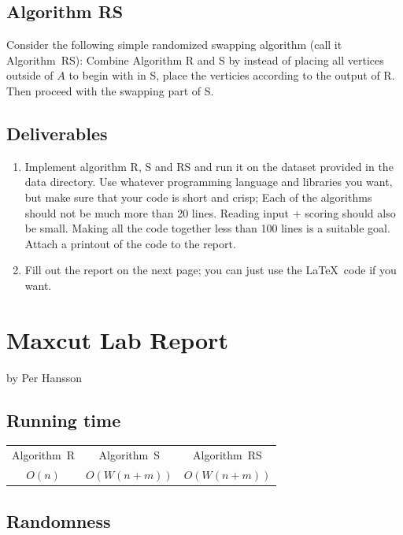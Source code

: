 \documentclass{tufte-handout}
\begin{document}
\subsection{Algorithm RS}
Consider the following simple randomized swapping algorithm (call
it Algorithm~RS): Combine Algorithm R and S by instead of placing
all vertices outside of $A$ to begin with in S, place the verticies according
to the output of R. Then proceed with the swapping part of S.

\subsection{ Deliverables}

\begin{enumerate}
\item Implement algorithm R, S and RS and run it on the dataset provided in
  the data directory.
  Use whatever programming language and libraries you want, but make
  sure that your code is short and crisp; Each of the algorithms should 
  not be much more than 20 lines. Reading input + scoring should also be
  small. Making all the code together less than 100 lines is a suitable goal.
  Attach a printout of the code to the report.
\item Fill out the report on the next page; you can just use the
  \LaTeX\ code if you want.
\end{enumerate}

\newpage


\newpage
\section{Maxcut Lab Report}


by Per Hansson
\subsection{Running time}

\begin{tabular}{ c c c }
    Algorithm~R & Algorithm~S & Algorithm~RS \\ 
    $O(n)$ 
    & $O(W(n+m))$
     & $O(W(n+m))$ 
\end{tabular}

\subsection{Randomness}
\end{document}
